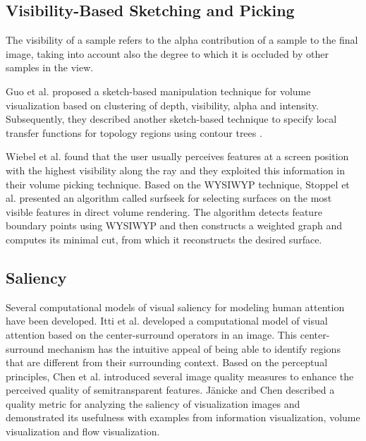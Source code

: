 \documentclass{egpubl}
\begin{document}
\subsection{Visibility-Based Sketching and Picking}

The visibility of a sample refers to the alpha contribution of a sample to the final image, taking into account also the degree to which it is occluded by other samples in the view.

Guo et al. \cite{guo_wysiwyg_2011} proposed a sketch-based manipulation technique for volume visualization based on clustering of depth, visibility, alpha and intensity. Subsequently, they described another sketch-based technique to specify local transfer functions for topology regions using contour trees \cite{guo_local_2013}. 

Wiebel et al. \cite{wiebel_wysiwyp:_2012} found that the user usually perceives features at a screen position with the highest visibility along the ray and they exploited this information in their volume picking technique.
Based on the WYSIWYP technique, Stoppel et al. \cite{elmqvist_visibility-driven_2014} presented an algorithm called surfseek for selecting surfaces on the most visible features in direct volume rendering. The algorithm detects feature boundary points using WYSIWYP and then constructs a weighted graph and computes its minimal cut, from which it reconstructs the desired surface.

\subsection{Saliency}
Several computational models of visual saliency for modeling human attention have been developed.
Itti et al. \cite{itti_model_1998} developed a computational model of visual attention based on the center-surround operators in an image. This center-surround mechanism has the intuitive appeal of being able to identify regions that are different from their surrounding context.
Based on the perceptual principles, Chen et al. \cite{chan_perception-based_2009} introduced several image quality measures to enhance the perceived quality of semitransparent features.
J{\"a}nicke and Chen \cite{janicke_salience-based_2010} described a quality metric for analyzing the saliency of visualization images and demonstrated its usefulness with examples from information visualization, volume visualization and flow visualization.
\end{document}
